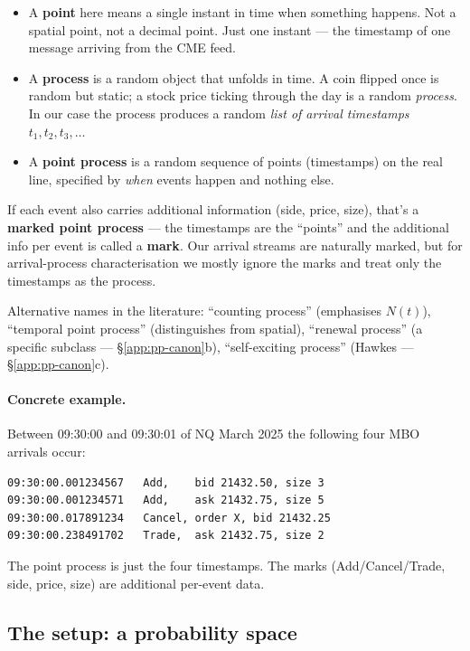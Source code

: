 \begin{itemize}
    \item A \textbf{point} here means a single instant in time when something happens. Not a spatial point, not a decimal point. Just one instant --- the timestamp of one message arriving from the CME feed.
    \item A \textbf{process} is a random object that unfolds in time. A coin flipped once is random but static; a stock price ticking through the day is a random \emph{process}. In our case the process produces a random \emph{list of arrival timestamps} $t_1, t_2, t_3, \ldots$
    \item A \textbf{point process} is a random sequence of points (timestamps) on the real line, specified by \emph{when} events happen and nothing else.
\end{itemize}

If each event also carries additional information (side, price, size), that's a \textbf{marked point process} --- the timestamps are the ``points'' and the additional info per event is called a \textbf{mark}. Our arrival streams are naturally marked, but for arrival-process characterisation we mostly ignore the marks and treat only the timestamps as the process.

Alternative names in the literature: ``counting process'' (emphasises $N(t)$), ``temporal point process'' (distinguishes from spatial), ``renewal process'' (a specific subclass --- \S\ref{app:pp-canon}b), ``self-exciting process'' (Hawkes --- \S\ref{app:pp-canon}c).

\paragraph{Concrete example.} Between 09:30:00 and 09:30:01 of NQ March 2025 the following four MBO arrivals occur:
\begin{verbatim}
09:30:00.001234567   Add,    bid 21432.50, size 3
09:30:00.001234571   Add,    ask 21432.75, size 5
09:30:00.017891234   Cancel, order X, bid 21432.25
09:30:00.238491702   Trade,  ask 21432.75, size 2
\end{verbatim}
The point process is just the four timestamps. The marks (Add/Cancel/Trade, side, price, size) are additional per-event data.

\subsection{The setup: a probability space}
\label{app:pp-probspace}

